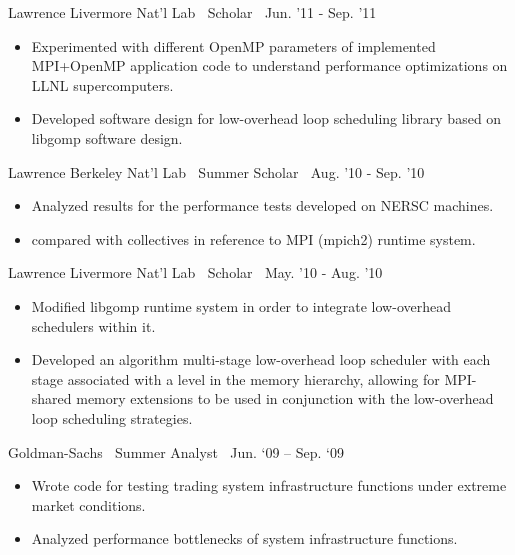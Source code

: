 {Lawrence Livermore Nat’l Lab$\>$$\>$$\>$$\>$Scholar$\>$$\>$$\>$$\>$Jun. '11 - Sep. '11}
\vspace*{-0.0in}
\begin{itemize} 
\item Experimented with different OpenMP parameters of implemented MPI+OpenMP application code to understand performance optimizations on
LLNL supercomputers.
\item Developed software design for low-overhead loop scheduling library based on libgomp software design.
\end{itemize} 

{Lawrence Berkeley Nat’l Lab$\>$$\>$$\>$$\>$Summer Scholar$\>$$\>$$\>$$\>$Aug. '10 - Sep. '10}
\begin{itemize}
\item Analyzed results for the performance tests developed on NERSC machines.
\item compared with collectives in reference to MPI (mpich2) runtime system.
\end{itemize}

{Lawrence Livermore Nat’l Lab$\>$$\>$$\>$$\>$Scholar$\>$$\>$$\>$$\>$May. '10 - Aug. '10}
\begin{itemize}
\item Modified libgomp runtime system in order to integrate low-overhead schedulers within it.
\item Developed an algorithm multi-stage low-overhead loop scheduler with each stage associated with a level in the memory hierarchy, allowing for MPI-shared memory extensions to be used in conjunction with the low-overhead loop scheduling strategies.
\end{itemize}
{Goldman-Sachs$\>\>\>\>$Summer Analyst$\>\>\>\>$Jun. ‘09 – Sep. ‘09}
\vspace*{-0.0in}
\begin{itemize}
\item Wrote code for testing trading system infrastructure functions under extreme market conditions.
\item Analyzed performance bottlenecks of system infrastructure functions.
\end{itemize}
